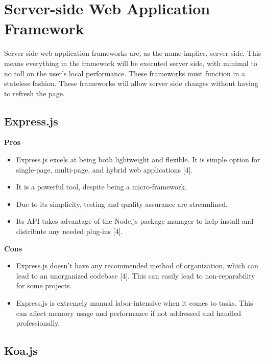 \documentclass[onecolumn, draftclsnofoot,10pt, compsoc]{IEEEtran}
\begin{document}
\section{Server-side Web Application Framework}
Server-side web application frameworks are, as the name implies, server side. This means everything in the framework will be executed server side, with minimal to no toll on the user's local performance. These frameworks must function in a stateless fashion. These frameworks will allow server side changes without having to refresh the page.
	\subsection{Express.js}
			\textbf{Pros}
			\begin{itemize}
				\item Express.js excels at being both lightweight and flexible. It is simple option for single-page, multi-page, and hybrid web applications [4]. 
				\item It is a powerful tool, despite being a micro-framework. 
				\item Due to its simplicity, testing and quality assurance are streamlined. 
				\item Its API takes advantage of the Node.js package manager to help install and distribute any needed plug-ins [4].
			\end{itemize}	
		\textbf{Cons}
			\begin{itemize}
				\item Express.js doesn't have any recommended method of organization, which can lead to an unorganized codebase [4]. This can easily lead to non-reparability for some projects. 
				\item Express.js is extremely manual labor-intensive when it comes to tasks. This can affect memory usage and performance if not addressed and handled professionally.
			\end{itemize}	
	\subsection{Koa.js}
	
\end{document}
